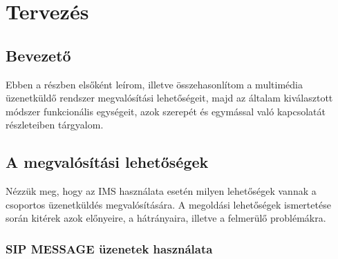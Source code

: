 

\section{Tervezés}

\subsection{Bevezető}

Ebben a részben elsőként leírom, illetve összehasonlítom a multimédia üzenetküldő rendszer megvalósítási lehetőségeit, majd az általam kiválasztott módszer funkcionális egységeit, azok szerepét és egymással való kapcsolatát részleteiben tárgyalom.

\subsection{A megvalósítási lehetőségek}

Nézzük meg, hogy az IMS használata esetén milyen lehetőségek vannak a csoportos üzenetküldés megvalósítására. A megoldási lehetőségek ismertetése során kitérek azok előnyeire, a hátrányaira, illetve a felmerülő problémákra.

\subsubsection{SIP MESSAGE üzenetek használata}
\label{sec:sip_message}

